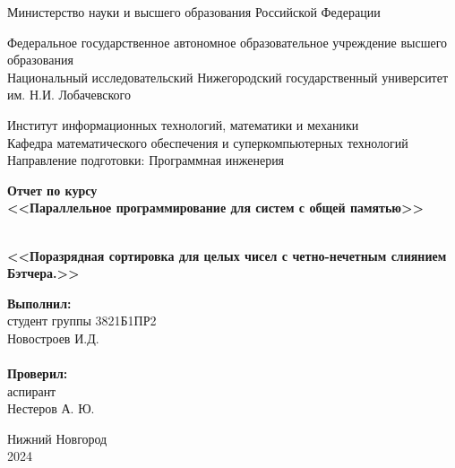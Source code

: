 \documentclass{report}
\begin{document}
\begin{titlepage}

\begin{center}
Министерство науки и высшего образования Российской Федерации
\end{center}

\begin{center}
Федеральное государственное автономное образовательное учреждение высшего образования \\
Национальный исследовательский Нижегородский государственный университет \newline им. Н.И. Лобачевского
\end{center}

\begin{center}
Институт информационных технологий, математики и механики \\
Кафедра математического обеспечения и суперкомпьютерных технологий \\
Направление подготовки: Программная инженерия
\end{center}

\begin{center}
\textbf{Отчет по курсу \\
\vspace{0.5em}
<<Параллельное программирование для систем с общей памятью>>} \\
\end{center}

\vspace{4em}

\begin{center}
\textbf{ \\
\vspace{0.5em}
<<Поразрядная сортировка для целых чисел с четно-нечетным слиянием Бэтчера.>>} \\
\end{center}

\vspace{4em}

\newbox{\lbox}
\newlength{\maxl}
\setlength{\maxl}{\wd\lbox}
\hfill\parbox{7cm}{
\hspace*{5cm}\hspace*{-5cm}\textbf{Выполнил:} \\ студент группы 3821Б1ПР2\\Новостроев И.Д.\\
\\
\hspace*{5cm}\hspace*{-5cm}\textbf{Проверил:}\\ аспирант\\Нестеров А. Ю.\\
}
\vspace{\fill}

\begin{center} Нижний Новгород \\ 2024 \end{center}

\end{titlepage}
\end{document}
